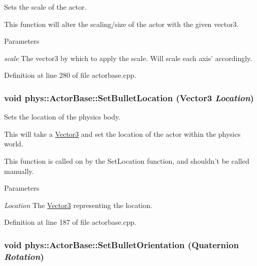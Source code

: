 Sets the scale of the actor. 

This function will alter the scaling/size of the actor with the given vector3. 
\begin{DoxyParams}{Parameters}
\item[{\em scale}]The vector3 by which to apply the scale. Will scale each axis' accordingly. \end{DoxyParams}


Definition at line 280 of file actorbase.cpp.

\hypertarget{classphys_1_1ActorBase_aa7ab524d2905e640cea6324cce9ccfdb}{
\subsubsection[{SetBulletLocation}]{\setlength{\rightskip}{0pt plus 5cm}void phys::ActorBase::SetBulletLocation ({\bf Vector3} {\em Location})}}
\label{d8/d0f/classphys_1_1ActorBase_aa7ab524d2905e640cea6324cce9ccfdb}


Sets the location of the physics body. 

This will take a \hyperlink{classphys_1_1Vector3}{Vector3} and set the location of the actor within the physics world. \par
 This function is called on by the SetLocation function, and shouldn't be called manually. 
\begin{DoxyParams}{Parameters}
\item[{\em Location}]The \hyperlink{classphys_1_1Vector3}{Vector3} representing the location. \end{DoxyParams}


Definition at line 187 of file actorbase.cpp.

\hypertarget{classphys_1_1ActorBase_a492244ac46ced53b809f436da992bc84}{
\subsubsection[{SetBulletOrientation}]{\setlength{\rightskip}{0pt plus 5cm}void phys::ActorBase::SetBulletOrientation ({\bf Quaternion} {\em Rotation})}}
\label{d8/d0f/classphys_1_1ActorBase_a492244ac46ced53b809f436da992bc84}


